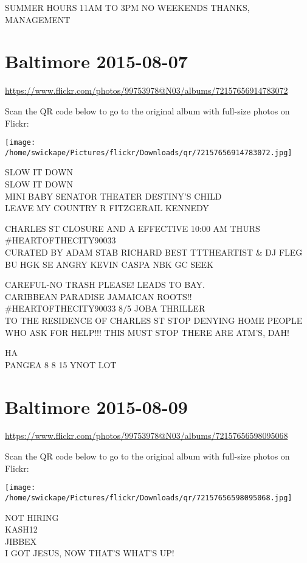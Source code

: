 \documentclass[10pt,letterpaper]{article}
\begin{document}
SUMMER HOURS 11AM TO 3PM NO WEEKENDS THANKS, MANAGEMENT


\section*{Baltimore 2015-08-07}

\url{https://www.flickr.com/photos/99753978@N03/albums/72157656914783072}

Scan the QR code below to go to the original album with full-size photos on Flickr:

\texttt{[image: /home/swickape/Pictures/flickr/Downloads/qr/72157656914783072.jpg]}


SLOW IT DOWN\\
SLOW IT DOWN\\
MINI BABY SENATOR THEATER DESTINY'S CHILD\\
LEAVE MY COUNTRY R FITZGERAIL KENNEDY

CHARLES ST CLOSURE AND A EFFECTIVE 10:00 AM THURS\\
\#HEARTOFTHECITY90033\\
CURATED BY ADAM STAB RICHARD BEST TTTHEARTIST \& DJ FLEG\\
BU HGK SE ANGRY KEVIN CASPA NBK GC SEEK

CAREFUL{-}NO TRASH PLEASE! LEADS TO BAY.\\
CARIBBEAN PARADISE JAMAICAN ROOTS!!\\
\#HEARTOFTHECITY90033 8/5 JOBA THRILLER\\
TO THE RESIDENCE OF CHARLES ST STOP DENYING HOME PEOPLE WHO ASK FOR HELP!!!  THIS MUST STOP THERE ARE ATM'S, DAH!

HA\\
PANGEA 8 8 15 YNOT LOT


\section*{Baltimore 2015-08-09}

\url{https://www.flickr.com/photos/99753978@N03/albums/72157656598095068}

Scan the QR code below to go to the original album with full-size photos on Flickr:

\texttt{[image: /home/swickape/Pictures/flickr/Downloads/qr/72157656598095068.jpg]}


NOT HIRING\\
KASH12\\
JIBBEX\\
I GOT JESUS, NOW THAT'S WHAT'S UP!
\end{document}
